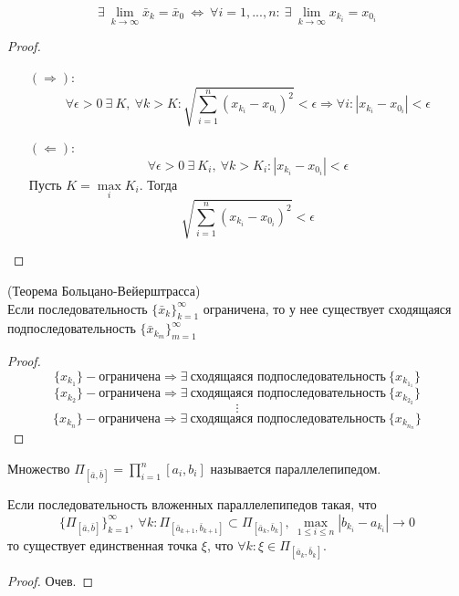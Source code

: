 \begin{theorem}
    \[\exists\ \lim\limits_{k\to \infty}\bar{x}_k=\bar{x}_0\ \Leftrightarrow\ \forall i=1,...,n:\ \exists\ \lim\limits_{k\to \infty}x_{k_i}=x_{0_i}\]
\end{theorem} 
\begin{proof}\tab
    \begin{itemize}
        \item[$(\Rightarrow)$:] \[\forall \epsilon>0\ \exists\ K,\ \forall k>K: \sqrt{\sum\limits_{i=1}^{n}(x_{k_i}-x_{0_i})^2}<\epsilon \Rightarrow \forall i: |x_{k_i}-x_{0_i}|<\epsilon\]
        \item[$(\Leftarrow)$:] \[\forall \epsilon>0\ \exists\ K_i,\ \forall k>K_i: |x_{k_i}-x_{0_i}|<\epsilon\]
        Пусть $K=\max\limits_i K_i$. Тогда
        \[\sqrt{\sum\limits_{i=1}^{n}(x_{k_i}-x_{0_i})^2}<\epsilon\]
    \end{itemize}
\end{proof} 
\begin{theorem} (Теорема Больцано-Вейерштрасса)\\
    Если последовательность $\{\bar{x}_k\}_{k=1}^{\infty}$ ограничена, то у нее существует сходящаяся подпоследовательность $\{\bar{x}_{k_m}\}_{m=1}^{\infty}$
\end{theorem} 
\begin{proof}
    \[\{x_{k_1}\} - \text{ограничена} \Rightarrow \exists\ \text{сходящаяся подпоследовательность}\ \{x_{k_{1_1}}\}\]
    \[\{x_{k_2}\} - \text{ограничена} \Rightarrow \exists\ \text{сходящаяся подпоследовательность}\ \{x_{k_{2_2}}\}\]
    \[\vdots\]
    \[\{x_{k_n}\} - \text{ограничена} \Rightarrow \exists\ \text{сходящаяся подпоследовательность}\ \{x_{k_{n_n}}\}\]
\end{proof} 
\begin{definition}
    Множество $\Pi_{[\bar{a}, \bar{b}]}=\prod\limits_{i=1}^{n}[a_i,b_i]$ называется параллелепипедом.
\end{definition} 
\begin{theorem}
    Если последовательность вложенных параллелепипедов такая, что
    \[\{\Pi_{[\bar{a}, \bar{b}]}\}_{k=1}^{\infty},\ \forall k: \Pi_{[\bar{a}_{k+1}, \bar{b}_{k+1}]} \subset \Pi_{[\bar{a}_{k}, \bar{b}_{k}]},\ \max\limits_{1\leq i\leq n}|b_{k_i}-a_{k_i}| \to 0\]
    то существует единственная точка $\xi$, что $\forall k: \xi\in \Pi_{[\bar{a}_k, \bar{b}_k]}$.
\end{theorem} 
\begin{proof}
    Очев.
\end{proof}
